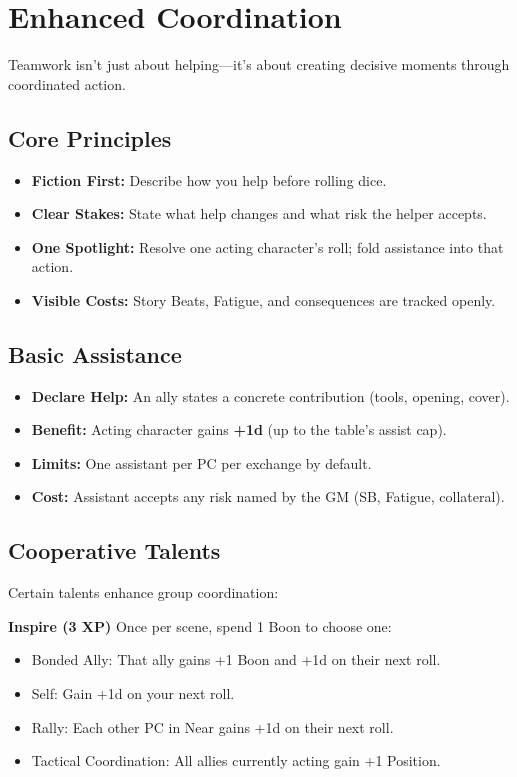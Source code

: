 \section{Enhanced Coordination}

Teamwork isn't just about helping---it's about creating decisive moments through coordinated action.

\subsection{Core Principles}
\begin{itemize}
  \item \textbf{Fiction First:} Describe how you help before rolling dice.
  \item \textbf{Clear Stakes:} State what help changes and what risk the helper accepts.
  \item \textbf{One Spotlight:} Resolve one acting character's roll; fold assistance into that action.
  \item \textbf{Visible Costs:} Story Beats, Fatigue, and consequences are tracked openly.
\end{itemize}

\subsection{Basic Assistance}
\begin{itemize}
  \item \textbf{Declare Help:} An ally states a concrete contribution (tools, opening, cover).
  \item \textbf{Benefit:} Acting character gains \textbf{+1d} (up to the table's assist cap).
  \item \textbf{Limits:} One assistant per PC per exchange by default.
  \item \textbf{Cost:} Assistant accepts any risk named by the GM (SB, Fatigue, collateral).
\end{itemize}

\subsection{Cooperative Talents}
Certain talents enhance group coordination:

\textbf{Inspire (3 XP)} Once per scene, spend 1 Boon to choose one:
\begin{itemize}
  \item Bonded Ally: That ally gains +1 Boon and +1d on their next roll.
  \item Self: Gain +1d on your next roll.
  \item Rally: Each other PC in Near gains +1d on their next roll.
  \item Tactical Coordination: All allies currently acting gain +1 Position.
\end{itemize}

